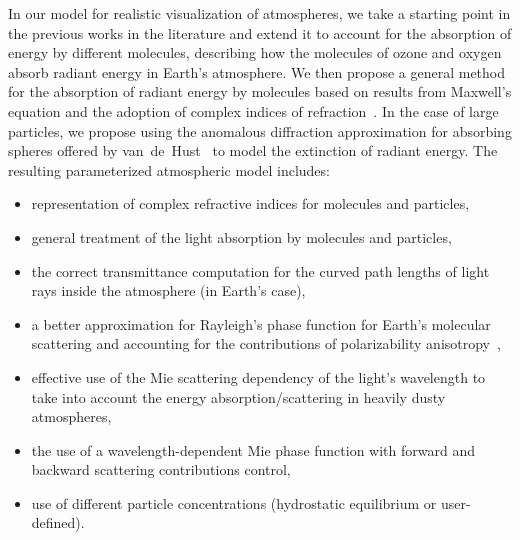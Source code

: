 \documentclass[journal]{vgtc}                %
\newcommand{\CS}[1]{\textbf{[CS~} \textcolor{orange}{#1} \textbf{~]}}
\newcommand{\anderscomment}[1]{\textbf{[AY~} \textcolor{cyan}{#1} \textbf{~]}}
\newcommand{\review}[1]{{\color{blue}#1}}
\begin{document}
In our model for realistic visualization of atmospheres, we take a starting point in the previous works in the literature and extend it to account for the absorption of energy by different molecules, describing how the molecules of ozone and oxygen absorb radiant energy in Earth's atmosphere. We then propose a general method for the absorption of radiant energy by molecules based on results from Maxwell's equation and the adoption of complex indices of refraction~\cite{Bohren:1983}. In the case of large particles, we propose using the anomalous diffraction approximation for absorbing spheres offered by van~de~Hust~\cite{Hulst:1981} to model the extinction of radiant energy. The resulting parameterized atmospheric model includes: 
\vspace{-1mm}
\begin{itemize}
	\item representation of complex refractive indices for molecules and particles,
	\vspace{-2.5mm}
	\item general treatment of the light absorption by molecules and particles,
	\vspace{-2.5mm}	\item the correct transmittance computation for the curved path lengths of light rays inside the atmosphere (in Earth's case),
	\vspace{-2.5mm}	\item a better approximation for Rayleigh's phase function for Earth's molecular scattering and accounting for the contributions of polarizability anisotropy~\cite{Rayleigh:1871},
	\vspace{-2.5mm}	\item effective use of the Mie scattering\cite{Mishchenko:2006}  dependency of the light's wavelength to take into account the energy absorption/scattering in heavily dusty atmospheres,
	\vspace{-2.5mm}	\item the use of a wavelength-dependent Mie phase function with  
    forward and backward scattering contributions control,
	\vspace{-2.5mm}	\item use of different particle concentrations (hydrostatic equilibrium or user-defined).
	\vspace{-1mm}
\end{itemize}
\end{document}
